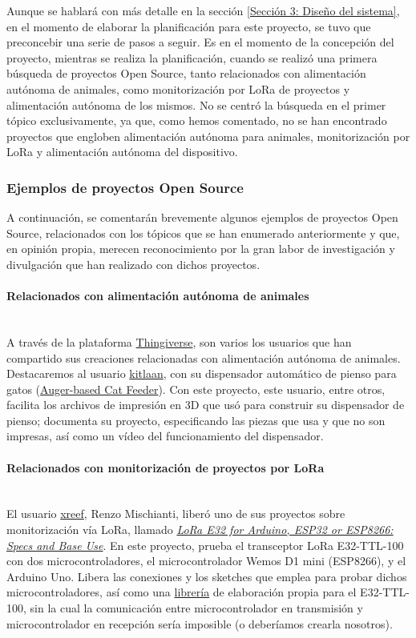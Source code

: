 \documentclass[12pt]{article}
\newcommand{\subsubsubsection}[1]{\paragraph{#1}\mbox{}\\}
\begin{document}
	\noindent Aunque se hablará con más detalle en la sección \ref{Sección 3: Diseño del sistema}, en el momento de elaborar la planificación para este proyecto, se tuvo que preconcebir una serie de pasos a seguir. Es en el momento de la concepción del proyecto, mientras se realiza la planificación, cuando se realizó una primera búsqueda de proyectos Open Source, tanto relacionados con alimentación autónoma de animales, como monitorización por LoRa de proyectos y alimentación autónoma de los mismos. No se centró la búsqueda en el primer tópico exclusivamente, ya que, como hemos comentado, no se han encontrado proyectos que engloben alimentación autónoma para animales, monitorización por LoRa y alimentación autónoma del dispositivo.\\
	
	\subsubsection{Ejemplos de proyectos Open Source}
	
	\noindent A continuación, se comentarán brevemente algunos ejemplos de proyectos Open Source, relacionados con los tópicos que se han enumerado anteriormente y que, en opinión propia, merecen reconocimiento por la gran labor de investigación y divulgación que han realizado con dichos proyectos. 
	
	\subsubsubsection{Relacionados con alimentación autónoma de animales}
	
	\noindent A través de la plataforma \href{https://www.thingiverse.com/}{Thingiverse}, son varios los usuarios que han compartido sus creaciones relacionadas con alimentación autónoma de animales. Destacaremos al usuario \href{https://www.thingiverse.com/kitlaan/designs}{kitlaan}, con su dispensador automático de pienso para gatos (\href{https://www.thingiverse.com/thing:27854}{Auger-based Cat Feeder}). Con este proyecto, este usuario, entre otros, facilita los archivos de impresión en 3D que usó para construir su dispensador de pienso; documenta su proyecto, especificando las piezas que usa y que no son impresas, así como un vídeo del funcionamiento del dispensador.
	
	\subsubsubsection{Relacionados con monitorización de proyectos por LoRa}
	
	\noindent El usuario \href{https://create.arduino.cc/projecthub/xreef}{xreef}, Renzo Mischianti, liberó uno de sus proyectos sobre monitorización vía LoRa, llamado \href{https://create.arduino.cc/projecthub/xreef/lora-e32-for-arduino-esp32-or-esp8266-specs-and-base-use-804d25}{\textit{LoRa E32 for Arduino, ESP32 or ESP8266: Specs and Base Use}}. En este proyecto, prueba el transceptor LoRa E32-TTL-100 con dos microcontroladores, el microcontrolador Wemos D1 mini (ESP8266), y el Arduino Uno. Libera las conexiones y los sketches que emplea para probar dichos microcontroladores, así como una \href{https://github.com/xreef/LoRa_E32_Series_Library}{librería} de elaboración propia para el E32-TTL-100, sin la cual la comunicación entre microcontrolador en transmisión y microcontrolador en recepción sería imposible (o deberíamos crearla nosotros).
	
\end{document}
